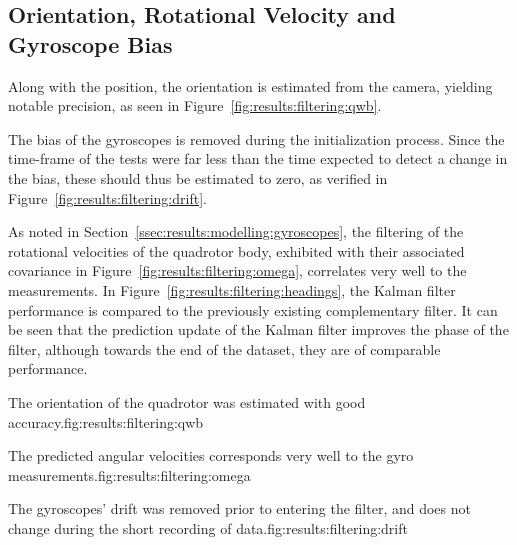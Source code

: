 \subsection{Orientation, Rotational Velocity and Gyroscope Bias}
    Along with the position, the orientation is estimated from the camera,
    yielding notable precision, as seen in Figure~\ref{fig:results:filtering:qwb}.

    The bias of the gyroscopes is removed during the initialization process.
    Since the time-frame of the tests were far less than the time expected to
    detect a change in the bias, these should thus be estimated to zero,
    as verified in Figure~\ref{fig:results:filtering:drift}.

    As noted in Section~\ref{ssec:results:modelling:gyroscopes}, the
    filtering of the rotational velocities of the quadrotor body,
    exhibited with their associated covariance in Figure~\ref{fig:results:filtering:omega},
    correlates very well to the measurements.
    In Figure~\ref{fig:results:filtering:headings}, the Kalman filter performance is compared
    to the previously existing complementary filter. It can be seen that
    the prediction update of the Kalman filter improves the phase of the filter,
    although towards the end of the dataset, they are of comparable performance.

    \begin{subfigures}{The orientation of the quadrotor was estimated with good accuracy.}{fig:results:filtering:qwb}
    \end{subfigures}

    \begin{subfigures}{The predicted angular velocities corresponds very well to the gyro measurements.}{fig:results:filtering:omega}
    \end{subfigures}

    \begin{subfigures}{The gyroscopes' drift was removed prior to entering the filter, and does not change during the short recording of data.}{fig:results:filtering:drift}
    \end{subfigures}

